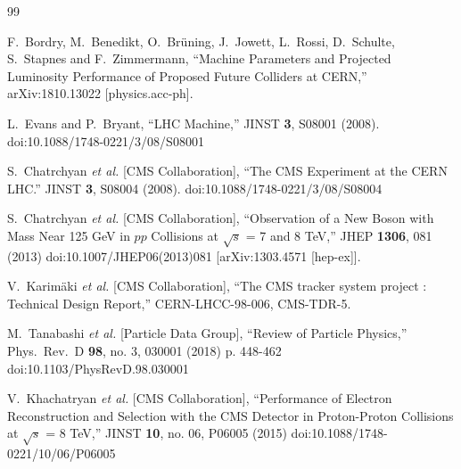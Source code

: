 \begin{thebibliography}{99}
  
  F.~Bordry, M.~Benedikt, O.~Brüning, J.~Jowett, L.~Rossi, D.~Schulte, S.~Stapnes and F.~Zimmermann,
  ``Machine Parameters and Projected Luminosity Performance of Proposed Future Colliders at CERN,''
  arXiv:1810.13022 [physics.acc-ph].
  
  L.~Evans and P.~Bryant,
  ``LHC Machine,''
  JINST {\bf 3}, S08001 (2008).
  doi:10.1088/1748-0221/3/08/S08001
  
    S.~Chatrchyan {\it et al.} [CMS Collaboration],
  ``The CMS Experiment at the CERN LHC.''
  JINST {\bf 3}, S08004 (2008).
  doi:10.1088/1748-0221/3/08/S08004
  
  S.~Chatrchyan {\it et al.} [CMS Collaboration],
  ``Observation of a New Boson with Mass Near 125 GeV in $pp$ Collisions at $\sqrt{s}$ = 7 and 8 TeV,''
  JHEP {\bf 1306}, 081 (2013)
  doi:10.1007/JHEP06(2013)081
  [arXiv:1303.4571 [hep-ex]].
  
  V.~Karimäki {\it et al.} [CMS Collaboration],
  ``The CMS tracker system project : Technical Design Report,''
  CERN-LHCC-98-006, CMS-TDR-5.
  
  M.~Tanabashi {\it et al.} [Particle Data Group],
  ``Review of Particle Physics,''
  Phys.\ Rev.\ D {\bf 98}, no. 3, 030001 (2018) p. 448-462
  doi:10.1103/PhysRevD.98.030001
  
  V.~Khachatryan {\it et al.} [CMS Collaboration],
  ``Performance of Electron Reconstruction and Selection with the CMS Detector in Proton-Proton Collisions at $\sqrt{s}$ = 8  TeV,''
  JINST {\bf 10}, no. 06, P06005 (2015)
  doi:10.1088/1748-0221/10/06/P06005
  

\end{thebibliography}
